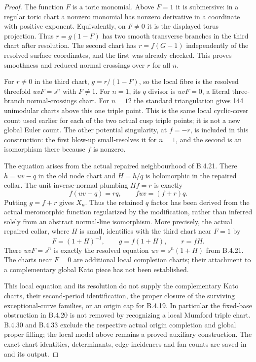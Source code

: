 \begin{proof}
The function $F$ is a toric monomial. Above $F=1$
it is submersive: in a regular toric chart a
nonzero monomial has nonzero derivative in a
coordinate with positive exponent. Equivalently,
on $F\ne0$ it is the displayed torus projection.
Thus $r=g(1-F)$ has two smooth transverse
branches in the third chart after resolution.
The second chart has $r=f(G-1)$ independently
of the resolved surface coordinates, and the
first was already checked. This proves smoothness
and reduced normal crossings over $r$ for all $n$.

For $r\ne0$ in the third chart,
$g=r/(1-F)$, so the local fibre is the resolved
threefold $uvF=s^n$ with $F\ne1$.
For $n=1$, its $q$ divisor is $uvF=0$, a literal
three-branch normal-crossings chart. For $n=12$
the standard triangulation gives 144 unimodular
charts above this one triple point. This is the
same local cyclic-cover count used earlier for
each of the two actual cusp triple points; it
is not a new global Euler count. The other
potential singularity, at $f=-r$, is included
in this construction: the first blow-up small-resolves it
for $n=1$, and the second is an isomorphism there
because $f$ is nonzero.

The equation arises from the actual repaired
neighbourhood of B.4.21. There $h=uv-q$ in the
old node chart and $H=h/q$ is holomorphic in the
repaired collar. The unit inverse-normal plumbing
$Hf=r$ is exactly
\[
 f(uv-q)=rq,
 \qquad fuv=(f+r)q.
\]
Putting $g=f+r$ gives $X_n$. Thus the retained
$q$ factor has been derived from the actual
meromorphic function regularized by the
modification, rather than inferred solely from
an abstract normal-line isomorphism.
More precisely, the actual repaired collar, where $H$ is small,
identifies with the third chart near $F=1$ by
\[
 F=(1+H)^{-1},\qquad g=f(1+H),\qquad r=fH.
\]
There $uvF=s^n$ is exactly the resolved equation
$uv=s^n(1+H)$ from B.4.21. The charts near $F=0$
are additional local completion charts; their attachment
to a complementary global Kato piece has not been established.

This local equation and its resolution do not
supply the complementary Kato charts, their
second-period identification, the proper closure
of the surviving exceptional-curve families, or
an origin cap for B.4.19. In particular the
fixed-base obstruction in B.4.20 is not removed
by recognizing a local Mumford triple chart. B.4.30 and
B.4.33 exclude the respective actual origin completion
and global proper filling; the local model above remains
a proved auxiliary construction.
The exact chart identities, determinants, edge
incidences and fan counts are saved in
 and its
output.


\end{proof}
